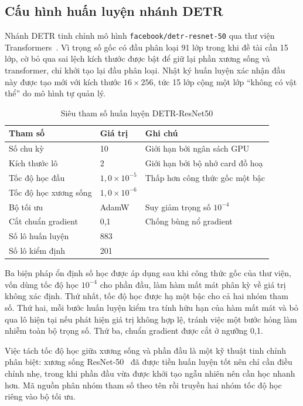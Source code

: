 \subsection{Cấu hình huấn luyện nhánh DETR}

Nhánh DETR tinh chỉnh mô hình \texttt{facebook/detr-resnet-50} qua thư viện
Transformers~\cite{wolf2020transformers}. Vì trọng số gốc có đầu phân loại 91 lớp trong khi đề tài
cần 15 lớp, cờ bỏ qua sai lệch kích thước được bật để giữ lại phần xương sống và transformer, chỉ
khởi tạo lại đầu phân loại. Nhật ký huấn luyện xác nhận đầu này được tạo mới với kích thước
$16 \times 256$, tức 15 lớp cộng một lớp ``không có vật thể'' do mô hình tự quản lý.

\begin{table}[H]
\centering
\caption{Siêu tham số huấn luyện DETR-ResNet50}
\label{tab:detr_cfg}
\small
\begin{tabular}{lll}
\toprule
\textbf{Tham số} & \textbf{Giá trị} & \textbf{Ghi chú} \\
\midrule
Số chu kỳ            & 10      & Giới hạn bởi ngân sách GPU \\
Kích thước lô        & 2       & Giới hạn bởi bộ nhớ card đồ hoạ \\
Tốc độ học đầu       & $1{,}0 \times 10^{-5}$ & Thấp hơn công thức gốc một bậc \\
Tốc độ học xương sống& $1{,}0 \times 10^{-6}$ & \\
Bộ tối ưu            & AdamW   & Suy giảm trọng số $10^{-4}$~\cite{loshchilov2019adamw} \\
Cắt chuẩn gradient   & 0,1     & Chống bùng nổ gradient~\cite{pascanu2013gradientclipping} \\
Số lô huấn luyện     & 883     & \\
Số lô kiểm định      & 201     & \\
\bottomrule
\end{tabular}
\end{table}

Ba biện pháp ổn định số học được áp dụng sau khi công thức gốc của thư viện, vốn dùng tốc độ học
$10^{-4}$ cho phần đầu, làm hàm mất mát phân kỳ về giá trị không xác định. Thứ nhất, tốc độ học
được hạ một bậc cho cả hai nhóm tham số. Thứ hai, mỗi bước huấn luyện kiểm tra tính hữu hạn của
hàm mất mát và bỏ qua lô hiện tại nếu phát hiện giá trị không hợp lệ, tránh việc một bước hỏng làm
nhiễm toàn bộ trọng số. Thứ ba, chuẩn gradient được cắt ở ngưỡng 0,1.

Việc tách tốc độ học giữa xương sống và phần đầu là một kỹ thuật tinh chỉnh phân biệt: xương sống
ResNet-50~\cite{he2016resnet} đã được tiền huấn luyện tốt nên chỉ cần điều chỉnh nhẹ, trong khi
phần đầu vừa được khởi tạo ngẫu nhiên nên cần học nhanh hơn. Mã nguồn phân nhóm tham số theo tên
rồi truyền hai nhóm tốc độ học riêng vào bộ tối ưu.

